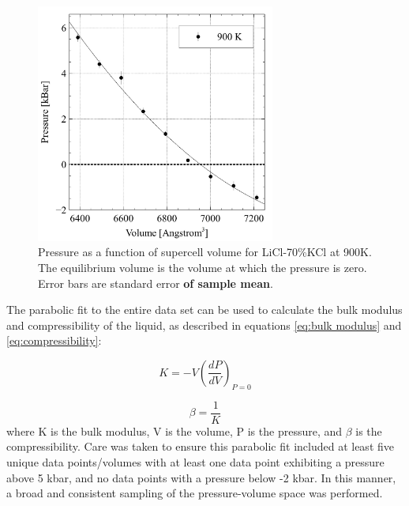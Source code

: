 \documentclass[review]{elsarticle}
\providecommand{\DIFaddtex}[1]{{\bf #1}} %
\providecommand{\DIFaddFL}[1]{\DIFadd{#1}} %
\providecommand{\DIFaddbeginFL}{} %
\providecommand{\DIFaddendFL}{} %
\providecommand{\DIFdelbeginFL}{} %
\providecommand{\DIFdelendFL}{} %
\providecommand{\DIFadd}[1]{\texorpdfstring{\DIFaddtex{#1}}{#1}} %
\newcommand{\DIFscaledelfig}{0.5}
\newlength{\DIFdelgraphicswidth} %
\newlength{\DIFdelgraphicsheight} %
\newcommand{\DIFaddincludegraphics}[2][]{{\color{blue}\fbox{\DIFOincludegraphics[#1]{#2}}}} %
\newcommand{\DIFdelincludegraphics}[2][]{%
\sbox{\DIFdelgraphicsbox}{\DIFOincludegraphics[#1]{#2}}%
\settoboxwidth{\DIFdelgraphicswidth}{\DIFdelgraphicsbox} %
\settoboxtotalheight{\DIFdelgraphicsheight}{\DIFdelgraphicsbox} %
\scalebox{\DIFscaledelfig}{%
\parbox[b]{\DIFdelgraphicswidth}{\usebox{\DIFdelgraphicsbox}\\[-\baselineskip] \rule{\DIFdelgraphicswidth}{0em}}\llap{\resizebox{\DIFdelgraphicswidth}{\DIFdelgraphicsheight}{%
\setlength{\unitlength}{\DIFdelgraphicswidth}%
\begin{picture}(1,1)%
\thicklines\linethickness{2pt} %
{\color[rgb]{1,0,0}\put(0,0){\framebox(1,1){}}}%
{\color[rgb]{1,0,0}\put(0,0){\line( 1,1){1}}}%
{\color[rgb]{1,0,0}\put(0,1){\line(1,-1){1}}}%
\end{picture}%
}\hspace*{3pt}}} %
} %
\DeclareRobustCommand{\DIFaddbeginFL}{\DIFOaddbeginFL \let\includegraphics\DIFaddincludegraphics} %
\DeclareRobustCommand{\DIFaddendFL}{\DIFOaddendFL \let\includegraphics\DIFOincludegraphics} %
\DeclareRobustCommand{\DIFdelbeginFL}{\DIFOdelbeginFL \let\includegraphics\DIFdelincludegraphics} %
\DeclareRobustCommand{\DIFdelendFL}{\DIFOaddendFL \let\includegraphics\DIFOincludegraphics} %
\begin{document}
 \begin{figure}[h]
 \centering
 \DIFdelbeginFL %
\DIFdelendFL \DIFaddbeginFL \includegraphics[width=0.7\textwidth]{images/PressureVsVolume.jpg} 
 \DIFaddendFL \caption{Pressure as a function of supercell volume for LiCl-70\%KCl at 900K. The equilibrium volume is the volume at which the pressure is zero. Error bars are standard error \DIFaddbeginFL \DIFaddFL{of sample mean}\DIFaddendFL .}
 \label{fig:VvsP}
\end{figure}

The parabolic fit to the entire data set can be used to calculate the bulk modulus and compressibility of the liquid, as described in equations \ref{eq:bulk modulus} and \ref{eq:compressibility}:

\begin{equation}
\label{eq:bulk modulus}
K = -V {(\frac{dP}{dV})}_{P=0}
\end{equation}

\begin{equation}
\label{eq:compressibility}
\beta = \frac{1}{K}
\end{equation}where K is the bulk modulus, V is the volume, P is the pressure, and $\beta$ is the compressibility. Care was taken to ensure this parabolic fit included at least five unique data points/volumes with at least one data point exhibiting a pressure above 5 kbar, and no data points with a pressure below  -2 kbar. In this manner, a broad and consistent sampling of the pressure-volume space was performed. 
\end{document}
